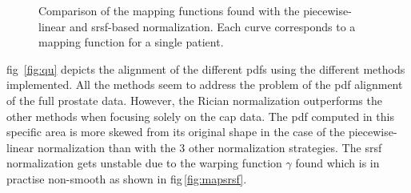 \begin{figure}
  \hspace*{\fill}
  \hfill
  \hspace*{\fill}
  \caption[Comparison of the mapping functions found with the piecewise-linear and \acs*{srsf}-based normalization.]{Comparison of the mapping functions found with the piecewise-linear and \acs*{srsf}-based normalization. Each curve corresponds to a mapping function for a single patient.}
  \label{fig:mapping}
\end{figure}

\Acl{fig}~\ref{fig:qu} depicts the alignment of the different \acp{pdf} using the different methods implemented. 
All the methods seem to address the problem of the \ac{pdf} alignment of the full prostate data.
However, the Rician normalization outperforms the other methods when focusing solely on the \ac{cap} data.
The \ac{pdf} computed in this specific area is more skewed from its original shape in the case of the piecewise-linear normalization than with the 3 other normalization strategies.
The \ac{srsf} normalization gets unstable due to the warping function $\gamma$ found which is in practise non-smooth as shown in \acs{fig}\,\ref{fig:mapsrsf}.

